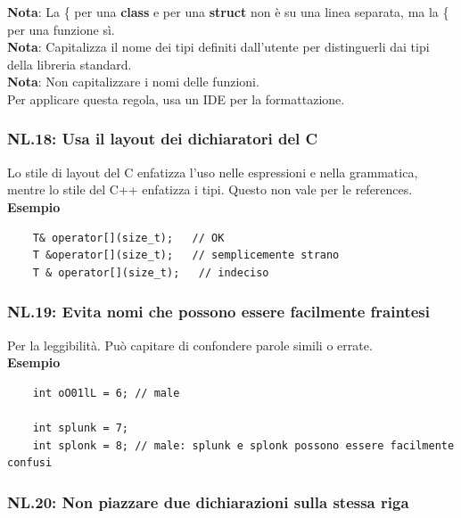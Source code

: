 \textsf{\small \textbf{Nota}: La \{ per una \textbf{class} e per una \textbf{struct} non è su una linea separata, ma la \{ per una funzione sì.} \\

\textsf{\small \textbf{Nota}: Capitalizza il nome dei tipi definiti dall'utente per distinguerli dai tipi della libreria standard.} \\

\textsf{\small \textbf{Nota}: Non capitalizzare i nomi delle funzioni.} \\

\textsf{\small Per applicare questa regola, usa un IDE per la formattazione.} \\

\subsubsection{NL.18: Usa il layout dei dichiaratori del C}

\textsf{\small Lo stile di layout del C enfatizza l'uso nelle espressioni e nella grammatica, mentre lo stile del C++ enfatizza i tipi. Questo non vale per le references.} \\ %

\textsf{\small \textbf{Esempio}} 

\begin{lstlisting}
	T& operator[](size_t);   // OK
	T &operator[](size_t);   // semplicemente strano
	T & operator[](size_t);   // indeciso
\end{lstlisting}

\subsubsection{NL.19: Evita nomi che possono essere facilmente fraintesi}

\textsf{\small Per la leggibilità. Può capitare di confondere parole simili o errate.} \\

\textsf{\small \textbf{Esempio}}

\begin{lstlisting}
	int oO01lL = 6; // male
	
	int splunk = 7;
	int splonk = 8; // male: splunk e splonk possono essere facilmente confusi
\end{lstlisting}

\subsubsection{NL.20: Non piazzare due dichiarazioni sulla stessa riga}

